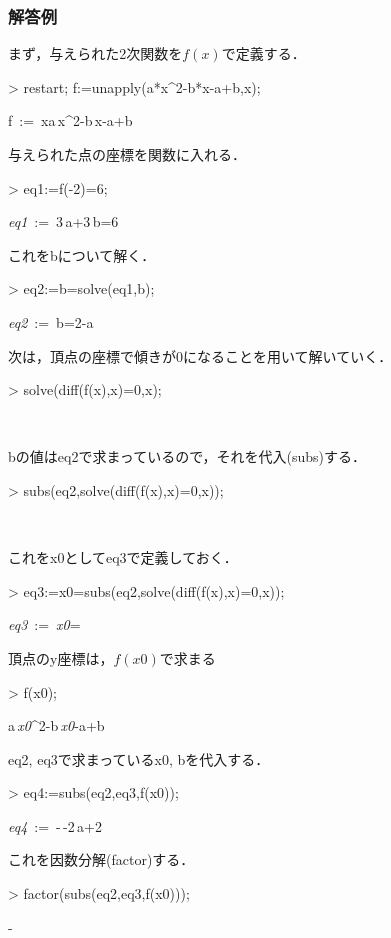 \subsubsection{解答例}
まず，与えられた2次関数を$f(x)$で定義する．
\begin{MapleInput}
> restart; f:=unapply(a*x^2-b*x-a+b,x);
\end{MapleInput}
\begin{MapleOutput}
 f\, := \,x\mapsto a\,{x}^{2}-b\,x-a+b
\end{MapleOutput}
与えられた点の座標を関数に入れる．
\begin{MapleInput}
> eq1:=f(-2)=6;
\end{MapleInput}
\begin{MapleOutput}
{\it eq1}\, := \,3\,a+3\,b=6
\end{MapleOutput}
これをbについて解く．
\begin{MapleInput}
> eq2:=b=solve(eq1,b);
\end{MapleInput}
\begin{MapleOutput}
{\it eq2}\, := \,b=2-a
\end{MapleOutput}
次は，頂点の座標で傾きが0になることを用いて解いていく．
\begin{MapleInput}
> solve(diff(f(x),x)=0,x);
\end{MapleInput}
\begin{MapleOutput}
\,{}
\end{MapleOutput}
bの値はeq2で求まっているので，それを代入(subs)する．
\begin{MapleInput}
> subs(eq2,solve(diff(f(x),x)=0,x));
\end{MapleInput}
\begin{MapleOutput}
\,{}
\end{MapleOutput}
これをx0としてeq3で定義しておく．
\begin{MapleInput}
> eq3:=x0=subs(eq2,solve(diff(f(x),x)=0,x));
\end{MapleInput}
\begin{MapleOutput}
{\it eq3}\, := \,{\it x0}=\,{}
\end{MapleOutput}
頂点のy座標は，$f(x0)$で求まる
\begin{MapleInput}
> f(x0);
\end{MapleInput}
\begin{MapleOutput}
a\,{{\it x0}}^{2}-b\,{\it x0}-a+b
\end{MapleOutput}
eq2, eq3で求まっているx0, bを代入する．
\begin{MapleInput}
> eq4:=subs({eq2,eq3},f(x0));
\end{MapleInput}
\begin{MapleOutput}
{\it eq4}\, := \,-\,{}-2\,a+2
\end{MapleOutput}
これを因数分解(factor)する．
\begin{MapleInput}
> factor(subs({eq2,eq3},f(x0)));
\end{MapleInput}
\begin{MapleOutput}
-\,{}
\end{MapleOutput}

